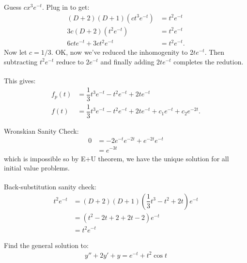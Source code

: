 \documentclass[11pt]{article}
\begin{document}
        \begin{solution}
            Guess $cx^3e^{-t}$. Plug in to get:
            \begin{align}
                (D+2)(D+1)(ct^3e^{-t}) &= t^2e^{-t} \\
                3c(D+2)(t^2e^{-t}) &= t^2e^{-t} \\
                6cte^{-t} + 3ct^2e^{-t} &= t^2e^{-t}.
            \end{align}
            Now let $c = 1/3$. OK, now we've reduced the inhomogenity to $2te^{-t}$. Then subtracting $t^2e^{-t}$ reduce to $2e^{-t}$ and finally adding $2te^{-t}$ completes the redution. \\~\\
            This gives:
            \begin{align}
                f_p(t) &= \dfrac{1}{3}t^3e^{-t} - t^2e^{-t} + 2te^{-t} \\
                f(t) &= \dfrac{1}{3}t^3e^{-t} - t^2e^{-t} + 2te^{-t} + c_1e^{-t} + c_2e^{-2t}.
            \end{align}
        \end{solution}
        \begin{remark}[Footnotes.]
            Wronskian Sanity Check:
            \begin{align}
                0 &= -2e^{-t}e^{-2t} + e^{-2t}e^{-t} \\
                &= e^{-3t}
            \end{align}
            which is impossible so by E+U theorem, we have the unique solution for all initial value problems. \\~\\
            Back-substitution sanity check:
            \begin{align}
                t^2e^{-t} &= (D+2)(D+1)\left(\dfrac{1}{3}t^3 - t^2 + 2t\right)e^{-t} \\
                &= \left(t^2 - 2t + 2 + 2t - 2\right)e^{-t} \\
                &= t^2e^{-t}
            \end{align}
        \end{remark}
    \newpage \setcounter{equation}{-1} \begin{problem} 
        Find the general solution to:
        \begin{align}
            y'' +2y' + y = e^{-t} + t^2\cos t
        \end{align}
    \end{problem}
\end{document}
